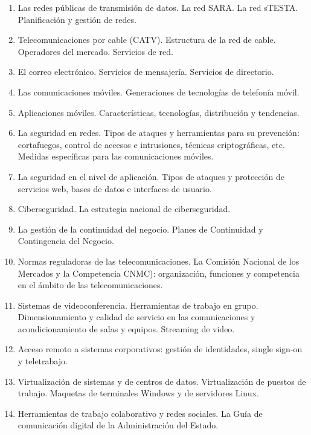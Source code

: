 \begin{enumerate}
		\item Las redes públicas de transmisión de datos. La red SARA. La red sTESTA. Planificación y gestión de redes.
		\item Telecomunicaciones por cable (CATV). Estructura de la red de cable. Operadores del mercado. Servicios de red.
		\item El correo electrónico. Servicios de mensajería. Servicios de directorio.
		\item Las comunicaciones móviles. Generaciones de tecnologías de telefonía móvil.
		\item Aplicaciones móviles. Características, tecnologías, distribución y tendencias.
		\item La seguridad en redes. Tipos de ataques y herramientas para su prevención: cortafuegos, control de accesos e intrusiones, técnicas criptográficas, etc. Medidas específicas para las comunicaciones móviles.
		\item La seguridad en el nivel de aplicación. Tipos de ataques y protección de servicios web, bases de datos e interfaces de usuario.
		\item Ciberseguridad. La estrategia nacional de ciberseguridad.
		\item La gestión de la continuidad del negocio. Planes de Continuidad y Contingencia del Negocio.
		\item Normas reguladoras de las telecomunicaciones. La Comisión Nacional de los Mercados y la Competencia  CNMC): organización, funciones y competencia en el ámbito de las telecomunicaciones.
		\item Sistemas de videoconferencia. Herramientas de trabajo en grupo. Dimensionamiento y calidad de servicio en las comunicaciones y acondicionamiento de salas y equipos. Streaming de video.
		\item Acceso remoto a sistemas corporativos: gestión de identidades, single sign-on y teletrabajo.
		\item Virtualización de sistemas y de centros de datos. Virtualización de puestos de trabajo. Maquetas de terminales Windows y de servidores Linux.
		\item Herramientas de trabajo colaborativo y redes sociales. La Guía de comunicación digital de la Administración del Estado.
	\end{enumerate}


\renewcommand{\thesubsubsection}{\thesubsection.\arabic{subsubsection}}